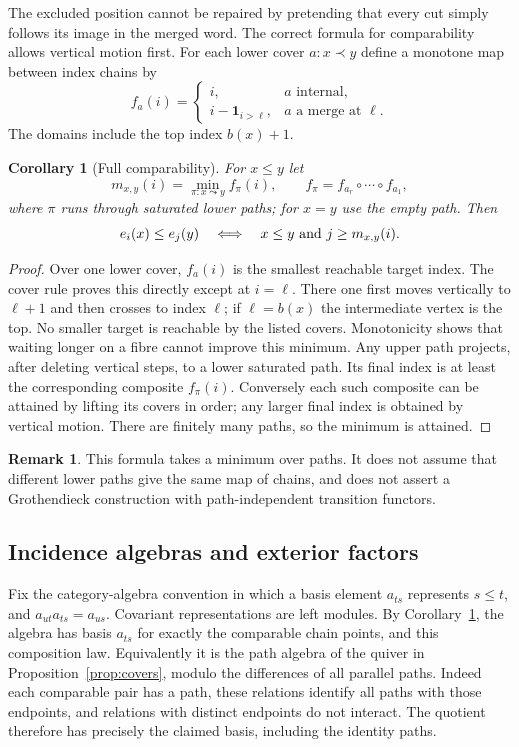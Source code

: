 \documentclass[11pt]{article}
\newtheorem{corollary}[theorem]{Corollary}
\theoremstyle{definition}
\newtheorem{remark}[theorem]{Remark}
\begin{document}
The excluded position cannot be repaired by pretending that every
cut simply follows its image in the merged word. The correct formula
for comparability allows vertical motion first.
For each lower cover $a:x\prec y$ define a monotone map between
index chains by
\[
 f_a(i)=
 \begin{cases}
 i,&a\text{ internal},\\
 i-\mathbf1_{i>\ell},&a\text{ a merge at }\ell.
 \end{cases}
\]
The domains include the top index $b(x)+1$.

\begin{corollary}[Full comparability]\label{cor:threshold}
For $x\leq y$ let
\[
 m_{x,y}(i)=\min_{\pi:x\leadsto y} f_\pi(i),
 \qquad f_\pi=f_{a_r}\circ\cdots\circ f_{a_1},
\]
where $\pi$ runs through saturated lower paths; for $x=y$ use the
empty path. Then
\[
 e_i(x)\leq e_j(y)\quad\Longleftrightarrow\quad
 x\leq y\ \hbox{and}\ j\geq m_{x,y}(i).
\]
\end{corollary}
\begin{proof}
Over one lower cover, $f_a(i)$ is the smallest reachable target
index. The cover rule proves this directly except at $i=\ell$.
There one first moves vertically to $\ell+1$ and then crosses to
index $\ell$; if $\ell=b(x)$ the intermediate vertex is the top.
No smaller target is reachable by the listed covers. Monotonicity
shows that waiting longer on a fibre cannot improve this minimum.
Any upper path projects, after deleting vertical steps, to a lower
saturated path. Its final index is at least the corresponding
composite $f_\pi(i)$. Conversely each such composite can be attained
by lifting its covers in order; any larger final index is obtained
by vertical motion. There are finitely many paths, so the minimum
is attained.
\end{proof}
\begin{remark}
This formula takes a minimum over paths. It does not assume that
different lower paths give the same map of chains, and does not
assert a Grothendieck construction with path-independent transition
functors.
\end{remark}


\subsection{Incidence algebras and exterior factors}
Fix the category-algebra convention in which a basis element
$a_{ts}$ represents $s\leq t$, and $a_{ut}a_{ts}=a_{us}$.
Covariant representations are left modules. By
Corollary~\ref{cor:threshold}, the algebra has basis $a_{ts}$ for
exactly the comparable chain points, and this composition law.
Equivalently it is the path algebra of the quiver in
Proposition~\ref{prop:covers}, modulo the differences of all parallel
paths. Indeed each comparable pair has a path, these relations
identify all paths with those endpoints, and relations with distinct
endpoints do not interact. The quotient therefore has precisely the
claimed basis, including the identity paths.
\end{document}
